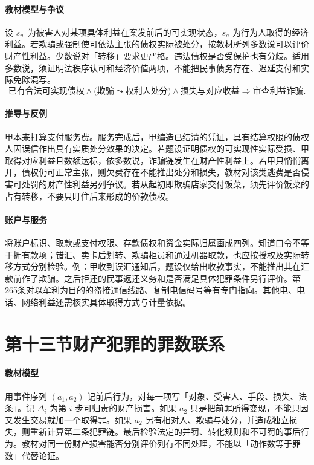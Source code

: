 \paragraph{教材模型与争议}
设 $s_w$ 为被害人对某项具体利益在案发前后的可实现状态，$s_a$ 为行为人取得的经济利益。若欺骗或强制使可依法主张的债权实际被处分，按教材所列多数说可以评价财产性利益。少数说对「转移」要求更严格。违法债权是否受保护也有分歧。适用多数说，须证明法秩序认可和经济价值两项，不能把民事债务存在、迟延支付和实际免除混写。
\[
 \text{已有合法可实现债权}\land
 \bigl(\text{欺骗}\leadsto\text{权利人处分}\bigr)
 \land\text{损失与对应收益}
 \Longrightarrow\text{审查利益诈骗}.
\]

\paragraph{推导与反例}
甲本来打算支付服务费。服务完成后，甲编造已结清的凭证，具有结算权限的债权人因误信作出具有实质处分效果的决定。若题设证明债权的可实现性实际受损、甲取得对应利益且数额达标，依多数说，诈骗链发生在财产性利益上。若甲只悄悄离开，债权仍可正常主张，则欠费存在不能推出处分和损失，教材对该类逃费是否侵害可处罚的财产性利益另列争议。若从起初即欺骗店家交付饭菜，须先评价饭菜的占有转移，不要只盯住后来形成的价款债权。

\paragraph{账户与服务}
将账户标识、取款或支付权限、存款债权和资金实际归属画成四列。知道口令不等于拥有款项；错汇、卖卡后划转、欺骗柜员和通过机器取款，也应按授权及实际转移方式分别检验。例：甲收到误汇通知后，题设仅给出收款事实，不能推出其在汇款前作了欺骗。之后拒还的民事返还义务和是否满足具体犯罪条件另行评价。第265条对以牟利为目的的盗接通信线路、复制电信码号等有专门指向。其他电、电话、网络利益还需核实具体取得方式与计量依据。

\section{第十三节\quad 财产犯罪的罪数联系}

\paragraph{教材模型}
用事件序列 $(a_1,a_2)$ 记前后行为，对每一项写「对象、受害人、手段、损失、法条」。记 $\Delta_i$ 为第 $i$ 步可归责的财产损害。如果 $a_2$ 只是把前罪所得变现，不能只因又发生交易就加一个取得罪。如果 $a_2$ 另有相对人、欺骗与处分，并造成独立损失，则重新计算第二条犯罪链。最后检验法定的并罚、转化规则和不可罚的事后行为。教材对同一份财产损害能否分别评价列有不同处理，不能以「动作数等于罪数」代替论证。

